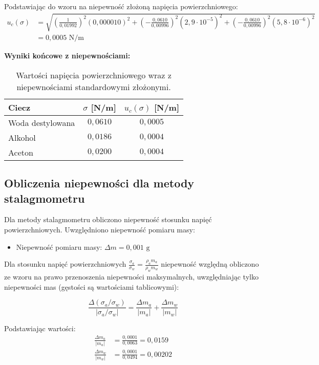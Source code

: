 \documentclass[a4paper,12pt]{article}
\begin{document}
Podstawiając do wzoru na niepewność złożoną napięcia powierzchniowego:
\begin{align*}
    u_c(\sigma) & = \sqrt{\left(\frac{1}{0{,}01992}\right)^2 (0{,}000010)^2 + \left(-\frac{0{,}0610}{0{,}00996}\right)^2 (2{,}9 \cdot 10^{-5})^2 + \left(-\frac{0{,}0610}{0{,}00996}\right)^2 (5{,}8 \cdot 10^{-6})^2} \\
                & = 0{,}0005 \text{ N/m}
\end{align*}

\noindent\textbf{Wyniki końcowe z niepewnościami:}

\begin{table}[H]
    \centering
    \begin{tabular}{|l|c|c|}
        \hline
        \textbf{Ciecz} & \textbf{$\sigma$ [N/m]} & \textbf{$u_c(\sigma)$ [N/m]} \\
        \hline
        Woda destylowana & $0{,}0610$ & $0{,}0005$ \\
        \hline
        Alkohol & $0{,}0186$ & $0{,}0004$ \\
        \hline
        Aceton & $0{,}0200$ & $0{,}0004$ \\
        \hline
    \end{tabular}
    \caption{Wartości napięcia powierzchniowego wraz z niepewnościami standardowymi złożonymi.}
    \label{tab:wyniki_z_niepewnosciami}
\end{table}

\subsection{Obliczenia niepewności dla metody stalagmometru}

Dla metody stalagmometru obliczono niepewność stosunku napięć powierzchniowych. Uwzględniono niepewność pomiaru masy:
\begin{itemize}
    \item Niepewność pomiaru masy: $\Delta m = 0{,}001\text{ g}$
\end{itemize}

Dla stosunku napięć powierzchniowych $\frac{\sigma_a}{\sigma_w} = \frac{\rho_a m_a}{\rho_w m_w}$ niepewność względną obliczono ze wzoru na prawo przenoszenia niepewności maksymalnych, uwzględniając tylko niepewności mas (gęstości są wartościami tablicowymi):

$$\frac{\Delta(\sigma_a/\sigma_w)}{|\sigma_a/\sigma_w|} = \frac{\Delta m_a}{|m_a|} + \frac{\Delta m_w}{|m_w|}$$

Podstawiając wartości:
\begin{align*}
    \frac{\Delta m_a}{|m_a|} & = \frac{0{,}0001}{0{,}0063} = 0{,}0159  \\
    \frac{\Delta m_w}{|m_w|} & = \frac{0{,}0001}{0{,}0494} = 0{,}00202
\end{align*}
\end{document}
